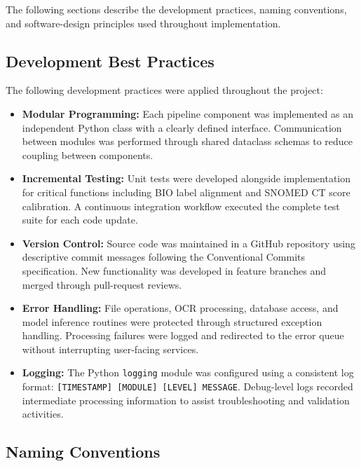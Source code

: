 The following sections describe the development practices, naming conventions, and software-design principles used throughout implementation.

\subsection{Development Best Practices}

The following development practices were applied throughout the project:

\begin{itemize}

\item \textbf{Modular Programming:} Each pipeline component was implemented as an independent Python class with a clearly defined interface. Communication between modules was performed through shared dataclass schemas to reduce coupling between components.

\item \textbf{Incremental Testing:} Unit tests were developed alongside implementation for critical functions including BIO label alignment and SNOMED CT score calibration. A continuous integration workflow executed the complete test suite for each code update.

\item \textbf{Version Control:} Source code was maintained in a GitHub repository using descriptive commit messages following the Conventional Commits specification. New functionality was developed in feature branches and merged through pull-request reviews.

\item \textbf{Error Handling:} File operations, OCR processing, database access, and model inference routines were protected through structured exception handling. Processing failures were logged and redirected to the error queue without interrupting user-facing services.

\item \textbf{Logging:} The Python \texttt{logging} module was configured using a consistent log format: \texttt{[TIMESTAMP] [MODULE] [LEVEL] MESSAGE}. Debug-level logs recorded intermediate processing information to assist troubleshooting and validation activities.

\end{itemize}

\subsection{Naming Conventions}

